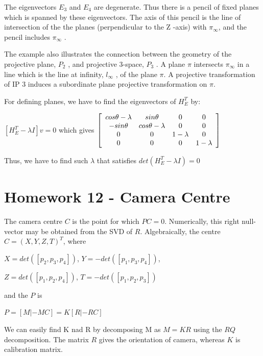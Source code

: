 \documentclass[]{article}
\begin{document}
\vspace{0.5em}

The eigenvectors $E_3$ and $E_4$ are degenerate. Thus there is a pencil of fixed planes which is spanned by these eigenvectors. The axis of this pencil is the line of intersection of the the planes (perpendicular to the Z -axis) with $\pi _ \infty$, and the pencil includes $\pi _ \infty$ .

The example also illustrates the connection between the geometry of the projective
plane, $P_2$ , and projective 3-space, $P_3$ . A plane $\pi$ intersects $\pi _ \infty$ in a line which is the line at infinity,  $l_ \infty$ , of the plane $\pi$. A projective transformation of IP 3 induces a subordinate plane projective transformation on $\pi$.

For defining planes, we have to find the eigenvectors of $H_E^T$ by:

\vspace{0.5em}

\centerline {
	$[H_E^T - \lambda I]v = 0 $ which gives $\left[ {\begin{array}{*{20}c}
		cos \theta - \lambda & sin \theta & 0 & 0 \\
		-sin \theta & cos \theta - \lambda & 0 & 0 \\ 
		0 & 0 & 1 - \lambda & 0 \\ 
		0 & 0 & 0 & 1 - \lambda   
		\end{array} } \right] $
}

\vspace{0.5em}

Thus, we have to find such $\lambda$ that satisfies $det(H_E^T - \lambda I) = 0$

\section{Homework 12 - Camera Centre }

The camera centre $C$ is the point for which $PC = 0$. Numerically, this right null-vector may be obtained from the SVD of $R$. Algebraically, the centre $C = (X, Y,Z,T)^T$, where 

\centerline {
	$X=det([p_2, p_3, p_4])$, $Y=-det([p_1, p_3, p_4])$, 
}

\centerline {
	$Z=det([p_1, p_2, p_4])$, $T=-det([p_1, p_2, p_3])$
}

and the $P$ is 

\centerline {
	$P=[M | -MC] = K[R | -RC ]$
}

We can easily find K nad R by decomposing M as $M = KR$ using the $RQ$ decomposition. The matrix $R$ gives the orientation of camera, whereas $K$ is calibration matrix. 
\end{document}
